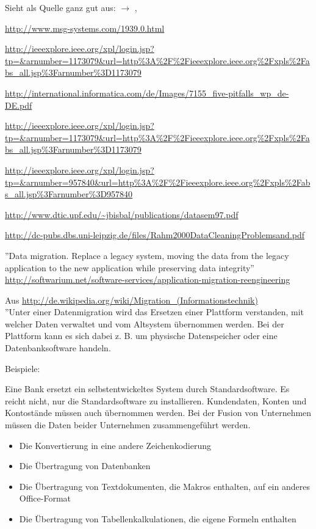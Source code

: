 \documentclass[11pt]{scrartcl}
\begin{document}
Sieht als Quelle ganz gut aus: $\rightarrow$ \cite{wagner-2014}, \cite{morris-2012}

\url{http://www.msg-systems.com/1939.0.html}

\url{http://ieeexplore.ieee.org/xpl/login.jsp?tp=&arnumber=1173079&url=http%3A%2F%2Fieeexplore.ieee.org%2Fxpls%2Fabs_all.jsp%3Farnumber%3D1173079}

\url{http://international.informatica.com/de/Images/7155_five-pitfalls_wp_de-DE.pdf}

\url{http://ieeexplore.ieee.org/xpl/login.jsp?tp=&arnumber=1173079&url=http%3A%2F%2Fieeexplore.ieee.org%2Fxpls%2Fabs_all.jsp%3Farnumber%3D1173079}
	
\url{http://ieeexplore.ieee.org/xpl/login.jsp?tp=&arnumber=957840&url=http%3A%2F%2Fieeexplore.ieee.org%2Fxpls%2Fabs_all.jsp%3Farnumber%3D957840}
	
\url{http://www.dtic.upf.edu/~jbisbal/publications/datasem97.pdf}

\url{http://dc-pubs.dbs.uni-leipzig.de/files/Rahm2000DataCleaningProblemsand.pdf}

''Data migration. Replace a legacy system, moving the data from the legacy application to the new application while preserving data integrity'' \url{http://softwarium.net/software-services/application-migration-reengineering}


Aus \url{http://de.wikipedia.org/wiki/Migration_(Informationstechnik)} \\

''Unter einer Datenmigration wird das Ersetzen einer Plattform verstanden, mit welcher Daten verwaltet und vom Altsystem übernommen werden. Bei der Plattform kann es sich dabei z. B. um physische Datenspeicher oder eine Datenbanksoftware handeln.

Beispiele:

Eine Bank ersetzt ein selbstentwickeltes System durch Standardsoftware. Es reicht nicht, nur die Standardsoftware zu installieren. Kundendaten, Konten und Kontostände müssen auch übernommen werden.
Bei der Fusion von Unternehmen müssen die Daten beider Unternehmen zusammengeführt werden.

\begin{itemize}
	\item Die Konvertierung in eine andere Zeichenkodierung
	\item Die Übertragung von Datenbanken
	\item Die Übertragung von Textdokumenten, die Makros enthalten, auf ein anderes Office-Format
	\item Die Übertragung von Tabellenkalkulationen, die eigene Formeln enthalten
\end{itemize}
\end{document}
